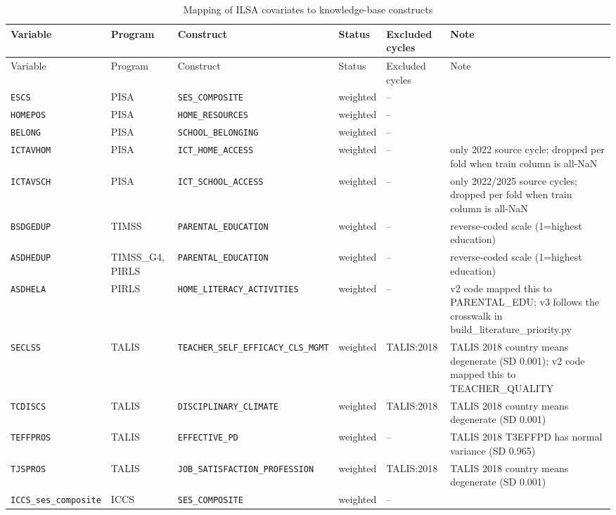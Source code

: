 {\scriptsize
\begin{longtable}{lllllp{5cm}}
\caption{Mapping of ILSA covariates to knowledge-base constructs}\label{tab:C2}\\
\toprule
Variable & Program & Construct & Status & Excluded cycles & Note \\
\midrule
\endfirsthead
\toprule
Variable & Program & Construct & Status & Excluded cycles & Note \\
\midrule
\endhead
\bottomrule
\endlastfoot
\texttt{ESCS} & PISA & \texttt{SES\_COMPOSITE} & weighted & -- &  \\
\texttt{HOMEPOS} & PISA & \texttt{HOME\_RESOURCES} & weighted & -- &  \\
\texttt{BELONG} & PISA & \texttt{SCHOOL\_BELONGING} & weighted & -- &  \\
\texttt{ICTAVHOM} & PISA & \texttt{ICT\_HOME\_ACCESS} & weighted & -- & only 2022 source cycle; dropped per fold when train column is all-NaN \\
\texttt{ICTAVSCH} & PISA & \texttt{ICT\_SCHOOL\_ACCESS} & weighted & -- & only 2022/2025 source cycles; dropped per fold when train column is all-NaN \\
\texttt{BSDGEDUP} & TIMSS & \texttt{PARENTAL\_EDUCATION} & weighted & -- & reverse-coded scale (1=highest education) \\
\texttt{ASDHEDUP} & TIMSS\_G4, PIRLS & \texttt{PARENTAL\_EDUCATION} & weighted & -- & reverse-coded scale (1=highest education) \\
\texttt{ASDHELA} & PIRLS & \texttt{HOME\_LITERACY\_ACTIVITIES} & weighted & -- & v2 code mapped this to PARENTAL\_EDU; v3 follows the crosswalk in build\_literature\_priority.py \\
\texttt{SECLSS} & TALIS & \texttt{TEACHER\_SELF\_EFFICACY\_CLS\_MGMT} & weighted & TALIS:2018 & TALIS 2018 country means degenerate (SD 0.001); v2 code mapped this to TEACHER\_QUALITY \\
\texttt{TCDISCS} & TALIS & \texttt{DISCIPLINARY\_CLIMATE} & weighted & TALIS:2018 & TALIS 2018 country means degenerate (SD 0.001) \\
\texttt{TEFFPROS} & TALIS & \texttt{EFFECTIVE\_PD} & weighted & -- & TALIS 2018 T3EFFPD has normal variance (SD 0.965) \\
\texttt{TJSPROS} & TALIS & \texttt{JOB\_SATISFACTION\_PROFESSION} & weighted & TALIS:2018 & TALIS 2018 country means degenerate (SD 0.001) \\
\texttt{ICCS\_ses\_composite} & ICCS & \texttt{SES\_COMPOSITE} & weighted & -- &  \\

\end{longtable}}
